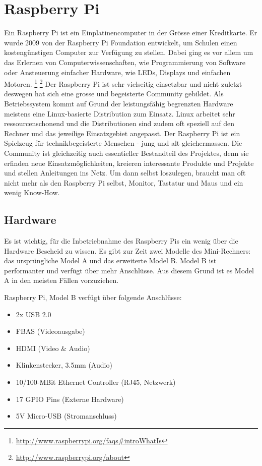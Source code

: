 \section{Raspberry Pi}
Ein Raspberry Pi ist ein Einplatinencomputer in der Grösse einer Kreditkarte.
Er wurde 2009 von der Raspberry Pi Foundation entwickelt, um Schulen einen kostengünstigen Computer zur Verfügung zu stellen.
Dabei ging es vor allem um das Erlernen von Computerwissenschaften, wie Programmierung von Software oder Ansteuerung einfacher Hardware, wie LEDs, Displays und einfachen Motoren.
\footnote{\url{http://www.raspberrypi.org/faqs\#introWhatIs}}
\footnote{\url{http://www.raspberrypi.org/about}}
Der Raspberry Pi ist sehr vielseitig einsetzbar und nicht zuletzt deswegen hat sich eine grosse und begeisterte Community gebildet. Als Betriebssystem kommt auf Grund der leistungsfähig begrenzten Hardware meistens eine Linux-basierte Distribution zum Einsatz. Linux arbeitet sehr ressourcenschonend und die Distributionen sind zudem oft speziell auf den Rechner und das jeweilige Einsatzgebiet angepasst.
Der Raspberry Pi ist ein Spielzeug für technikbegeisterte Menschen - jung und alt gleichermassen. Die Community ist gleichzeitig auch essentieller Bestandteil des Projektes, denn sie erfinden neue Einsatzmöglichkeiten, kreieren interessante Produkte und Projekte und stellen Anleitungen ins Netz. Um dann selbst loszulegen, braucht man oft nicht mehr als den Raspberry Pi selbst, Monitor, Tastatur und Maus und ein wenig Know-How.

\subsection{Hardware}
Es ist wichtig, für die Inbetriebnahme des Raspberry Pis ein wenig über die Hardware Bescheid zu wissen.
Es gibt zur Zeit zwei Modelle des Mini-Rechners: das ursprüngliche Model A und das erweiterte Model B. Model B ist performanter und verfügt über mehr Anschlüsse. Aus diesem Grund ist es Model A in den meisten Fällen vorzuziehen.

Raspberry Pi, Model B verfügt über folgende Anschlüsse:

\begin{itemize}
  \item 2x USB 2.0
  \item FBAS (Videoausgabe)
  \item HDMI (Video \& Audio)
  \item Klinkenstecker, 3.5mm (Audio)
  \item 10/100-MBit Ethernet Controller (RJ45, Netzwerk)
  \item 17 GPIO Pins (Externe Hardware)
  \item 5V Micro-USB (Stromanschluss)
\end{itemize}


